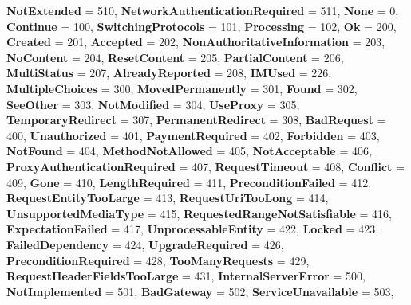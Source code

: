 \begin{DoxyCompactItemize}
{\bfseries Not\+Extended} = 510, 
{\bfseries Network\+Authentication\+Required} = 511, 
\newline
{\bfseries None} = 0, 
{\bfseries Continue} = 100, 
{\bfseries Switching\+Protocols} = 101, 
{\bfseries Processing} = 102, 
\newline
{\bfseries Ok} = 200, 
{\bfseries Created} = 201, 
{\bfseries Accepted} = 202, 
{\bfseries Non\+Authoritative\+Information} = 203, 
\newline
{\bfseries No\+Content} = 204, 
{\bfseries Reset\+Content} = 205, 
{\bfseries Partial\+Content} = 206, 
{\bfseries Multi\+Status} = 207, 
\newline
{\bfseries Already\+Reported} = 208, 
{\bfseries I\+M\+Used} = 226, 
{\bfseries Multiple\+Choices} = 300, 
{\bfseries Moved\+Permanently} = 301, 
\newline
{\bfseries Found} = 302, 
{\bfseries See\+Other} = 303, 
{\bfseries Not\+Modified} = 304, 
{\bfseries Use\+Proxy} = 305, 
\newline
{\bfseries Temporary\+Redirect} = 307, 
{\bfseries Permanent\+Redirect} = 308, 
{\bfseries Bad\+Request} = 400, 
{\bfseries Unauthorized} = 401, 
\newline
{\bfseries Payment\+Required} = 402, 
{\bfseries Forbidden} = 403, 
{\bfseries Not\+Found} = 404, 
{\bfseries Method\+Not\+Allowed} = 405, 
\newline
{\bfseries Not\+Acceptable} = 406, 
{\bfseries Proxy\+Authentication\+Required} = 407, 
{\bfseries Request\+Timeout} = 408, 
{\bfseries Conflict} = 409, 
\newline
{\bfseries Gone} = 410, 
{\bfseries Length\+Required} = 411, 
{\bfseries Precondition\+Failed} = 412, 
{\bfseries Request\+Entity\+Too\+Large} = 413, 
\newline
{\bfseries Request\+Uri\+Too\+Long} = 414, 
{\bfseries Unsupported\+Media\+Type} = 415, 
{\bfseries Requested\+Range\+Not\+Satisfiable} = 416, 
{\bfseries Expectation\+Failed} = 417, 
\newline
{\bfseries Unprocessable\+Entity} = 422, 
{\bfseries Locked} = 423, 
{\bfseries Failed\+Dependency} = 424, 
{\bfseries Upgrade\+Required} = 426, 
\newline
{\bfseries Precondition\+Required} = 428, 
{\bfseries Too\+Many\+Requests} = 429, 
{\bfseries Request\+Header\+Fields\+Too\+Large} = 431, 
{\bfseries Internal\+Server\+Error} = 500, 
\newline
{\bfseries Not\+Implemented} = 501, 
{\bfseries Bad\+Gateway} = 502, 
{\bfseries Service\+Unavailable} = 503, 

\end{DoxyCompactItemize}
